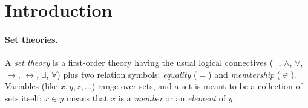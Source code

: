 \documentclass[sigplan,10pt,anonymous,review]{acmart}\settopmatter{printfolios=true,printccs=false,printacmref=false}
\begin{document}



\maketitle

\section{Introduction}


\paragraph{Set theories.}
A \emph{set theory} is a first-order theory having the usual logical connectives ($\neg$, $\land$, $\lor$, $\to$, $\leftrightarrow$, $\exists$, $\forall$) plus two relation symbols: \emph{equality} ($=$) and \emph{membership} ($\in$). Variables (like $x,y,z,\ldots$) range over sets, and a set is meant to be a collection of sets itself: $x \in y$ means that $x$ is a \emph{member} or an \emph{element} of $y$.
\end{document}
